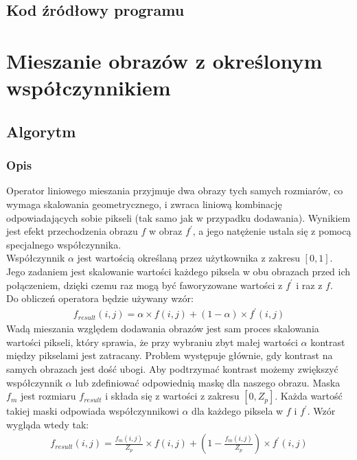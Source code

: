 \documentclass[a4paper,12pt]{book}
\begin{document}
\subsection*{Kod źródłowy programu}

\section{Mieszanie obrazów z określonym współczynnikiem}
\subsection*{Algorytm}
\subsubsection*{Opis}
Operator liniowego mieszania przyjmuje dwa obrazy tych samych rozmiarów, co wymaga skalowania geometrycznego, i zwraca liniową kombinację odpowiadających sobie pikseli (tak samo jak w przypadku dodawania). Wynikiem jest efekt przechodzenia obrazu $f$ w obraz $f^\prime$, a jego natężenie ustala się z pomocą specjalnego współczynnika. \\
Współczynnik $\alpha$ jest wartością określaną przez użytkownika z zakresu $[0,1]$. Jego zadaniem jest skalowanie wartości każdego piksela w obu obrazach przed ich połączeniem, dzięki czemu raz mogą być faworyzowane wartości z $f^\prime$ i raz z $f$. \\
Do obliczeń operatora będzie używany wzór: 
\begin{gather}
	f_{result}(i,j) = \alpha \times f(i,j) + (1 - \alpha) \times f^\prime(i,j)
\end{gather}
Wadą mieszania względem dodawania obrazów jest sam proces skalowania wartości pikseli, który sprawia, że przy wybraniu zbyt małej wartości $\alpha$ kontrast między pikselami jest zatracany. Problem występuje głównie, gdy kontrast na samych obrazach jest dość ubogi. Aby podtrzymać kontrast możemy zwiększyć współczynnik $\alpha$ lub zdefiniować odpowiednią maskę dla naszego obrazu. Maska $f_m$ jest rozmiaru $f_{result}$ i składa się z wartości z zakresu $[0, Z_p]$. Każda wartość takiej maski odpowiada współczynnikowi $\alpha$ dla każdego piksela w $f$ i $f^\prime$. Wzór wygląda wtedy tak: 
\begin{gather}
	f_{result}(i,j) = \frac{f_m(i,j)}{Z_p} \times f(i,j) + (1 - \frac{f_m(i,j)}{Z_p}) \times f^\prime(i,j)
\end{gather}
\end{document}
